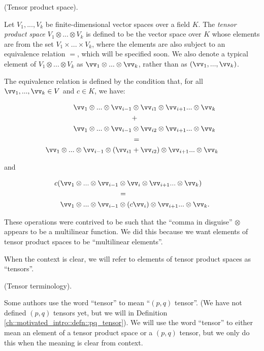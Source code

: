 \begin{defn}
\label{ch::motivated_intro::defn::tensor_product_space}
     (Tensor product space).
    
    Let $V_1, ..., V_k$ be finite-dimensional vector spaces over a field $K$. The \textit{tensor product space} $V_1 \otimes ... \otimes V_k$ is defined to be the vector space over $K$ whose elements are from the set $V_1 \times ... \times V_k$, where the elements are also subject to an equivalence relation $=$, which will be specified soon. We also denote a typical element of $V_1 \otimes ... \otimes V_k$ as $\vv_1 \otimes ... \otimes \vv_k$, rather than as $(\vv_1, ..., \vv_k)$. 
    
    The equivalence relation is defined by the condition that, for all $\vv_1, ..., \vv_k \in V$ and $c \in K$, we have:
    
    \begin{align*}
        \vv_1 \otimes ... \otimes \vv_{i - 1} &\otimes \vv_{i1} \otimes \vv_{i + 1} ... \otimes \vv_k \\
        &+ \\
        \vv_1 \otimes ... \otimes \vv_{i - 1} &\otimes \vv_{i2} \otimes \vv_{i + 1} ... \otimes \vv_k \\
        &= \\
        \vv_1 \otimes ... \otimes \vv_{i - 1} \otimes (\vv_{i1} &+ \vv_{i2}) \otimes \vv_{i + 1} ... \otimes \vv_k
    \end{align*}
    
    and
    
    \begin{align*}
        c (\vv_1 \otimes ... \otimes \vv_{i - 1} &\otimes \vv_i \otimes \vv_{i + 1} ... \otimes \vv_k ) \\
        &= \\
        \vv_1 \otimes ... \otimes \vv_{i - 1} &\otimes (c \vv_i) \otimes \vv_{i + 1} ... \otimes \vv_k.
    \end{align*}
    
    These operations were contrived to be such that the ``comma in disguise'' $\otimes$ appears to be a multilinear function. We did this because we want elements of tensor product spaces to be ``multilinear elements''.
    
    When the context is clear, we will refer to elements of tensor product spaces as ``tensors''.
\end{defn}

\begin{remark}
    (Tensor terminology). 
    
    Some authors use the word ``tensor'' to mean ``$(p, q)$ tensor''. (We have not defined $(p, q)$ tensors yet, but we will in Definition \ref{ch::motivated_intro::defn::pq_tensor}). We will use the word ``tensor'' to either mean an element of a tensor product space or a $(p, q)$ tensor, but we only do this when the meaning is clear from context.
\end{remark}

